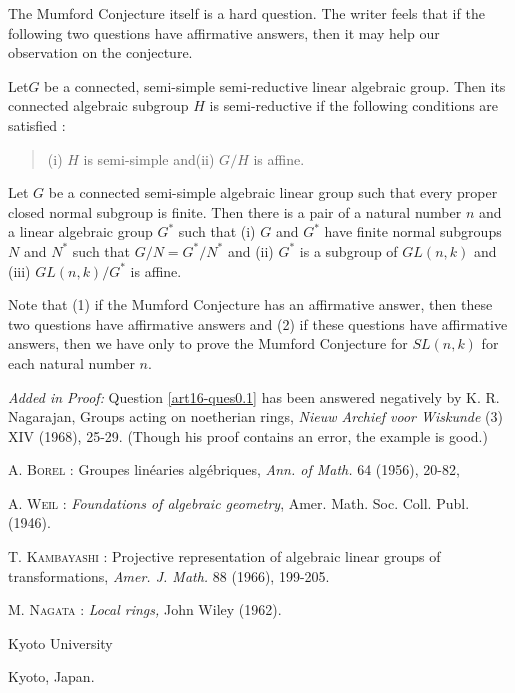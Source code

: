 The Mumford Conjecture itself is a hard question. The writer feels that if the following two questions have affirmative answers, then it may help our observation on the conjecture.

\begin{question}\label{art16-ques5.4}
Let\pageoriginale $G$ be a connected, semi-simple semi-reductive linear algebraic group. Then its connected algebraic subgroup $H$ is semi-reductive if the following conditions are satisfied :
\begin{quote}
(i) $H$ is semi-simple and\quad (ii) $G/H$ is affine.
\end{quote}
\end{question}

\begin{question}\label{art16-ques5.5}
Let $G$ be a connected semi-simple algebraic linear group such that every proper closed normal subgroup is finite. Then there is a pair of a natural number $n$ and a linear algebraic group $G^{*}$ such that (i) $G$ and $G^{*}$ have finite normal subgroups $N$ and $N^{*}$ such that $G/N=G^{*}/N^{*}$ and (ii) $G^{*}$ is a subgroup of $GL(n,k)$ and (iii) $GL(n,k)/G^{*}$ is affine.
\end{question}

Note that (1) if the Mumford Conjecture has an affirmative answer, then these two questions have affirmative answers and (2) if these questions have affirmative answers, then we have only to prove the Mumford Conjecture for $SL(n,k)$ for each natural number $n$.

{\em Added in Proof:} Question \ref{art16-ques0.1} has been answered negatively by K. R. Nagarajan, Groups acting on noetherian rings, {\em Nieuw Archief voor Wiskunde} (3) XIV (1968), 25-29. (Though his proof contains an error, the example is good.)

\bigskip

\begin{thebibliography}{99}
 \textsc{A. Borel :} Groupes lin\'earies alg\'ebriques, {\em Ann. of Math.} 64 (1956), 20-82,

 \textsc{A. Weil :} {\em Foundations of algebraic geometry}, Amer. Math. Soc. Coll. Publ. (1946).

 \textsc{T. Kambayashi :} Projective representation of algebraic linear groups of transformations, {\em Amer. J. Math.} 88 (1966), 199-205.

 \textsc{M. Nagata :} {\em Local rings,} John Wiley (1962).
\end{thebibliography}

\bigskip

\noindent
Kyoto University

\noindent
Kyoto, Japan.



